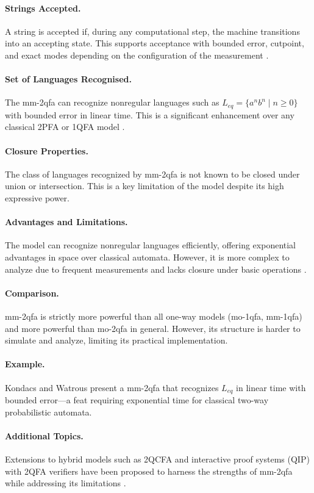 \paragraph{Strings Accepted.} A string is accepted if, during any computational step, the machine transitions into an accepting state. This supports acceptance with bounded error, cutpoint, and exact modes depending on the configuration of the measurement \cite{kondacs1997power}.

\paragraph{Set of Languages Recognised.} The \gls{mm-2qfa} can recognize nonregular languages such as $L_{eq} = \{ a^n b^n \mid n \geq 0 \}$ with bounded error in linear time. This is a significant enhancement over any classical 2PFA or 1QFA model \cite{kondacs1997power}.

\paragraph{Closure Properties.} The class of languages recognized by \gls{mm-2qfa} is not known to be closed under union or intersection. This is a key limitation of the model despite its high expressive power.

\paragraph{Advantages and Limitations.} The model can recognize nonregular languages efficiently, offering exponential advantages in space over classical automata. However, it is more complex to analyze due to frequent measurements and lacks closure under basic operations \cite{kondacs1997power, qiu2008state}.

\paragraph{Comparison.} \gls{mm-2qfa} is strictly more powerful than all one-way models (\gls{mo-1qfa}, \gls{mm-1qfa}) and more powerful than \gls{mo-2qfa} in general. However, its structure is harder to simulate and analyze, limiting its practical implementation.

\paragraph{Example.} Kondacs and Watrous \cite{kondacs1997power} present a \gls{mm-2qfa} that recognizes $L_{eq}$ in linear time with bounded error—a feat requiring exponential time for classical two-way probabilistic automata.

\paragraph{Additional Topics.} Extensions to hybrid models such as 2QCFA and interactive proof systems (QIP) with 2QFA verifiers have been proposed to harness the strengths of \gls{mm-2qfa} while addressing its limitations \cite{pani2011empowering, qiu2008state}.

